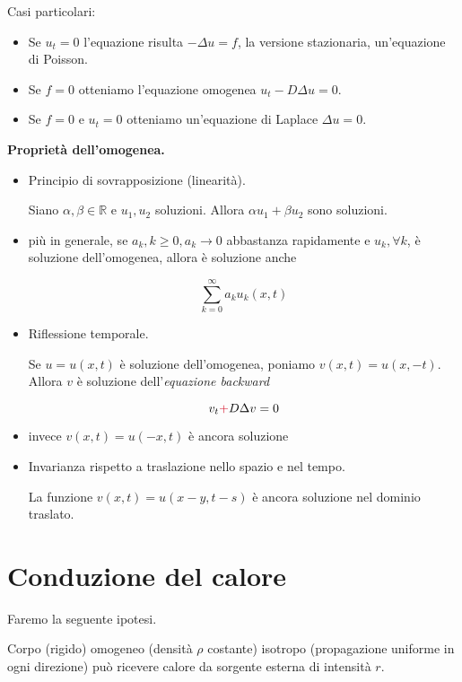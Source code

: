 \documentclass[10pt,a4paper,twoside,openright]{book}
\begin{document}
Casi particolari:
\begin{itemize}
\item Se $u_{t} =0$ l'equazione risulta $-\Delta u=f$, la versione stazionaria, un'equazione di Poisson.
\item Se $f=0$ otteniamo l'equazione omogenea $u_{t} -D\Delta u=0$.
\item Se $f=0$ e $u_{t} =0$ otteniamo un'equazione di Laplace $\Delta u=0$.
\end{itemize}

\textbf{Proprietà dell'omogenea.}
\begin{itemize}
\item Principio di sovrapposizione (linearità).

Siano $\alpha,\beta \in \mathbb{R}$ e $u_{1},u_{2}$ soluzioni. Allora $\alpha u_{1} +\beta u_{2}$ sono soluzioni.
\item più in generale, se $a_{k},k\geqslant 0,a_{k}\rightarrow 0$ abbastanza rapidamente e $u_{k},\forall k$, è soluzione dell'omogenea, allora è soluzione anche

\begin{equation*}
\sum\limits ^{\infty }_{k=0} a_{k} u_{k}(x,t)
\end{equation*}
\item Riflessione temporale.

Se $u=u(x,t)$ è soluzione dell'omogenea, poniamo $v(x,t) =u(x,-t)$. Allora $v$ è soluzione dell'\textit{equazione backward}

\begin{equation*}
v_{t}\textcolor[rgb]{0.82,0.01,0.11}{+} D\Delta v=0
\end{equation*}
\item invece $v(x,t) =u(-x,t)$ è ancora soluzione
\item Invarianza rispetto a traslazione nello spazio e nel tempo.

La funzione $v(x,t) =u(x-y,t-s)$ è ancora soluzione nel dominio traslato.
\end{itemize}
\section{Conduzione del calore}

Faremo la seguente ipotesi.

Corpo (rigido) omogeneo (densità $\rho $ costante) isotropo (propagazione uniforme in ogni direzione) può ricevere calore da sorgente esterna di intensità $r$.
\end{document}
